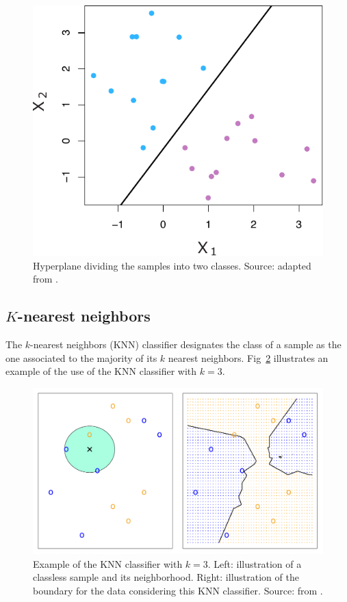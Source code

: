 \documentclass[conference]{IEEEtran}
\begin{document}
\begin{figure}
  \centering
  \includegraphics[width=0.8\columnwidth]{../figures/esl_9_5_left}
  \caption{Hyperplane dividing the samples into two classes. Source: adapted from \cite{james2013}.}
  \label{fig:svm}
\end{figure}

\subsection{$K$-nearest neighbors}

The $k$-nearest neighbors (KNN) classifier designates the class of a sample as the one associated to the majority of its $k$ nearest neighbors. Fig~\ref{fig:knn} illustrates an example of the use of the KNN classifier with $k=3$. 
%
\begin{figure}
  \centering
  \includegraphics[width=\columnwidth]{../figures/esl_2_14}
  \caption{Example of the KNN classifier with $k=3$. Left: illustration of a classless sample and its neighborhood. Right: illustration of the boundary for the data considering this KNN classifier. Source: from \cite{james2013}.}
  \label{fig:knn}
\end{figure}
\end{document}
